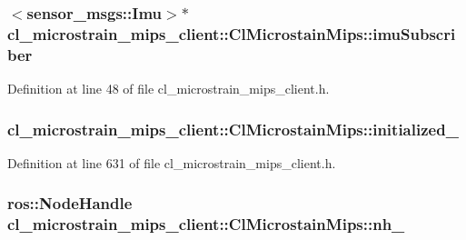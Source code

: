 \subsubsection[{\texorpdfstring{imu\+Subscriber}{imuSubscriber}}]{$<$sensor\+\_\+msgs\+::\+Imu$>$$\ast$ cl\+\_\+microstrain\+\_\+mips\+\_\+client\+::\+Cl\+Microstain\+Mips\+::imu\+Subscriber}\hypertarget{classcl__microstrain__mips__client_1_1ClMicrostainMips_a67fb90028f26ccd50817687ac280a296}{}\label{classcl__microstrain__mips__client_1_1ClMicrostainMips_a67fb90028f26ccd50817687ac280a296}


Definition at line 48 of file cl\+\_\+microstrain\+\_\+mips\+\_\+client.\+h.

\subsubsection[{\texorpdfstring{initialized\+\_\+}{initialized_}}]{ cl\+\_\+microstrain\+\_\+mips\+\_\+client\+::\+Cl\+Microstain\+Mips\+::initialized\+\_\+\hspace{0.3cm}{\ttfamily [protected]}}\hypertarget{classcl__microstrain__mips__client_1_1ClMicrostainMips_ae64a18fa74e07231740138a6a3b156c7}{}\label{classcl__microstrain__mips__client_1_1ClMicrostainMips_ae64a18fa74e07231740138a6a3b156c7}


Definition at line 631 of file cl\+\_\+microstrain\+\_\+mips\+\_\+client.\+h.

\subsubsection[{\texorpdfstring{nh\+\_\+}{nh_}}]{\setlength{\rightskip}{0pt plus 5cm}ros\+::\+Node\+Handle cl\+\_\+microstrain\+\_\+mips\+\_\+client\+::\+Cl\+Microstain\+Mips\+::nh\+\_\+\hspace{0.3cm}{\ttfamily [protected]}}\hypertarget{classcl__microstrain__mips__client_1_1ClMicrostainMips_a0892aa9866da5689621b8d4793661360}{}\label{classcl__microstrain__mips__client_1_1ClMicrostainMips_a0892aa9866da5689621b8d4793661360}


